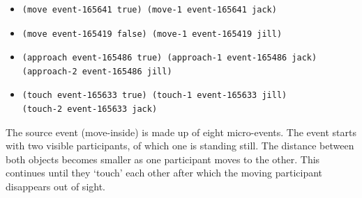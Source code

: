 \begin{itemize}
 \item
\begin{lstlisting}
(move event-165641 true) (move-1 event-165641 jack)
\end{lstlisting}
\item
\begin{lstlisting}
(move event-165419 false) (move-1 event-165419 jill)
\end{lstlisting}
\item
\begin{lstlisting}
(approach event-165486 true) (approach-1 event-165486 jack)
(approach-2 event-165486 jill)
\end{lstlisting}
\item
\begin{lstlisting}
(touch event-165633 true) (touch-1 event-165633 jill)
(touch-2 event-165633 jack) 
\end{lstlisting}
\end{itemize}

 

The source event (move-inside) is made up of eight micro-events. The event starts with two visible participants, of which one is standing still. The distance between both objects becomes smaller as one participant moves to the other. This continues until they `touch' each other after which the moving participant disappears out of sight.


